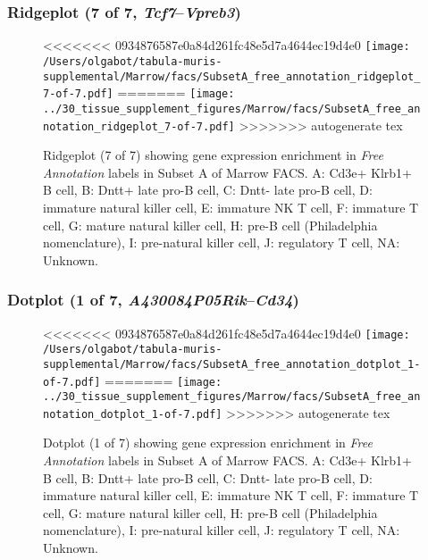 \subsubsection{Ridgeplot (7 of 7, \emph{Tcf7}--\emph{Vpreb3})}
\begin{figure}[h]
\centering
<<<<<<< 0934876587e0a84d261fc48e5d7a4644ec19d4e0
\texttt{[image: /Users/olgabot/tabula-muris-supplemental/Marrow/facs/SubsetA\_free\_annotation\_ridgeplot\_7-of-7.pdf]}
=======
\texttt{[image: ../30\_tissue\_supplement\_figures/Marrow/facs/SubsetA\_free\_annotation\_ridgeplot\_7-of-7.pdf]}
>>>>>>> autogenerate tex

\caption{ Ridgeplot (7 of 7)  showing gene expression enrichment in \emph{Free Annotation} labels in Subset A of Marrow FACS. A: Cd3e+ Klrb1+ B cell, B: Dntt+ late pro-B cell, C: Dntt- late pro-B cell, D: immature natural killer cell, E: immature NK T cell, F: immature T cell, G: mature natural killer cell, H: pre-B cell (Philadelphia nomenclature), I: pre-natural killer cell, J: regulatory T cell, NA: Unknown.}
\end{figure}


\clearpage

\subsubsection{Dotplot (1 of 7, \emph{A430084P05Rik}--\emph{Cd34})}
\begin{figure}[h]
\centering
<<<<<<< 0934876587e0a84d261fc48e5d7a4644ec19d4e0
\texttt{[image: /Users/olgabot/tabula-muris-supplemental/Marrow/facs/SubsetA\_free\_annotation\_dotplot\_1-of-7.pdf]}
=======
\texttt{[image: ../30\_tissue\_supplement\_figures/Marrow/facs/SubsetA\_free\_annotation\_dotplot\_1-of-7.pdf]}
>>>>>>> autogenerate tex

\caption{ Dotplot (1 of 7)  showing gene expression enrichment in \emph{Free Annotation} labels in Subset A of Marrow FACS. A: Cd3e+ Klrb1+ B cell, B: Dntt+ late pro-B cell, C: Dntt- late pro-B cell, D: immature natural killer cell, E: immature NK T cell, F: immature T cell, G: mature natural killer cell, H: pre-B cell (Philadelphia nomenclature), I: pre-natural killer cell, J: regulatory T cell, NA: Unknown.}
\end{figure}


\clearpage

